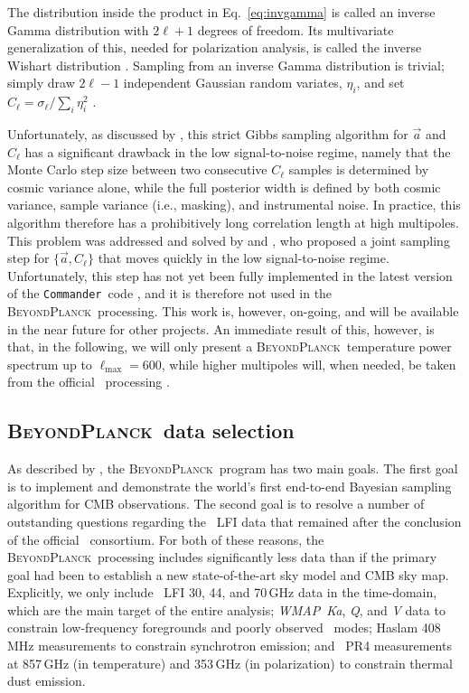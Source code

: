 \documentclass[twocolumn]{aa}
\def\WMAP{\textit{WMAP}}
\def\commander{\texttt{Commander}}
\renewcommand{\a}[0]{\vec{a}}
\newcommand{\BP}{\textsc{BeyondPlanck}}
\begin{document}
The distribution inside the product in Eq.~\eqref{eq:invgamma} is
called an inverse Gamma distribution with $2\ell+1$ degrees of
freedom. Its multivariate generalization of this, needed for
polarization analysis, is called the inverse Wishart distribution
\citep{larson:2006}. Sampling from an inverse Gamma distribution is
trivial; simply draw $2\ell-1$ independent Gaussian random variates,
$\eta_i$, and set $C_{\ell} = \sigma_{\ell}/\sum_{i}\eta_{i}^2$
\citep{wandelt2004}.

Unfortunately, as discussed by \citet{eriksen:2004}, this strict Gibbs
sampling algorithm for $\a$ and $C_{\ell}$ has a significant drawback
in the low signal-to-noise regime, namely that the Monte Carlo step
size between two consecutive $C_{\ell}$ samples is determined by
cosmic variance alone, while the full posterior width is defined by
both cosmic variance, sample variance (i.e., masking), and
instrumental noise. In practice, this algorithm therefore has a
prohibitively long correlation length at high multipoles. This problem
was addressed and solved by \citet{jewell:2009} and
\citet{racine:2016}, who proposed a joint sampling step for
$\{\a,C_{\ell}\}$ that moves quickly in the low signal-to-noise
regime. Unfortunately, this step has not yet been fully implemented in
the latest version of the \commander\ code \citep{bp03}, and it is
therefore not used in the \BP\ processing. This work is, however,
on-going, and will be available in the near future for other
projects. An immediate result of this, however, is that, in the following,  we will only present a \BP\ temperature power spectrum up to
$\ell_{\mathrm{max}}=600$, while higher multipoles will, when needed, be
taken from the official \Planck\ processing \citep{planck2016-l05}. 

\subsection{\BP\ data selection}

As described by \citet{bp01}, the \BP\ program has two main goals. The
first goal is to implement and demonstrate the world's first
end-to-end Bayesian sampling algorithm for CMB observations. The
second goal is to resolve a number of outstanding questions regarding
the \Planck\ LFI data that remained after the conclusion of the
official \Planck\ consortium. For both of these reasons, the
\BP\ processing includes significantly less data than if the primary
goal had been to establish a new state-of-the-art sky model and CMB
sky map. Explicitly, we only include \Planck\ LFI 30, 44, and 70\,GHz
data in the time-domain, which are the main target of the entire analysis;
\WMAP\ \textit{Ka}, \textit Q, and \textit V data to constrain low-frequency foregrounds and
poorly observed \Planck\ modes; Haslam 408\,MHz measurements to
constrain synchrotron emission; and \Planck\ PR4 measurements at 857\,GHz (in
temperature) and 353\,GHz (in polarization) to constrain thermal dust
emission.
\end{document}
